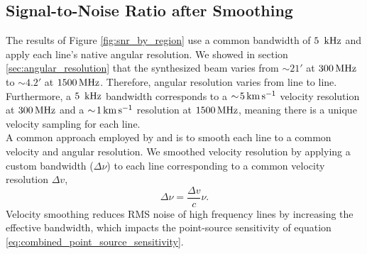 \subsection{Signal-to-Noise Ratio after Smoothing}
\label{sec:smoothed_snr}
The results of Figure \ref{fig:snr_by_region} use a common bandwidth of \( 5~\, \mathrm{kHz} \) and apply each line's native angular resolution. We showed in section \ref{sec:angular_resolution} that the synthesized beam varies from \( \sim\!21' \) at \( 300 \, \mathrm{MHz} \) to \( \sim\!4.2' \) at \( 1500 \, \mathrm{MHz} \). Therefore, angular resolution varies from line to line. Furthermore, a \( 5~\, \mathrm{kHz} \) bandwidth corresponds to a \( \sim\!5 \, \mathrm{km} \, \mathrm{s}^{-1} \) velocity resolution at \( 300 \, \mathrm{MHz} \) and a \( \sim\!1 \, \mathrm{km} \, \mathrm{s}^{-1} \) resolution at \( 1500 \, \mathrm{MHz} \), meaning there is a unique velocity sampling for each line.\\

A common approach employed by \citet{andersonGBTDiffuseIonized2021} and \citet{liuSIGGMASURVEYIONIZED2013} is to smooth each line to a common velocity and angular resolution.
We smoothed velocity resolution by applying a custom bandwidth (\(\Delta \nu\)) to each line corresponding to a common velocity resolution \( \Delta v \),
\begin{equation}
    \Delta \nu = \frac{\Delta v}{c} \nu.
\end{equation}
Velocity smoothing reduces RMS noise of high frequency lines by increasing the effective bandwidth, which impacts the point-source sensitivity of equation \ref{eq:combined_point_source_sensitivity}.\\

